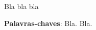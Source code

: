 \setlength{\absparsep}{18pt} %
\begin{resumo}
    Bla bla bla
	\vspace{\onelineskip}
	\noindent 
	
	\textbf{Palavras-chaves}: Bla. Bla.  
\end{resumo}

 
